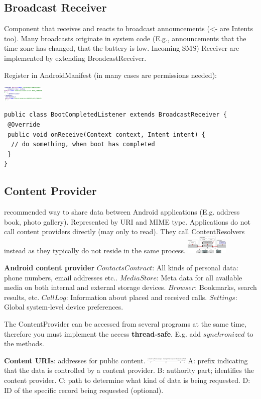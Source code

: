\subsection{Broadcast Receiver}
Component that receives and reacts to broadcast announcements (<- are Intents too).
Many broadcasts originate in system code (E.g., announcements that the time
zone has changed, that the battery is low. Incoming SMS)
Receiver are implemented by extending BroadcastReceiver.

Register in AndroidManifest (in many cases are permissions needed):

\includegraphics[width=0.15\textwidth]{android/broadcast_receiver.png}

\begin{lstlisting}
public class BootCompletedListener extends BroadcastReceiver {
 @Override
 public void onReceive(Context context, Intent intent) {
  // do something, when boot has completed
 }
}
\end{lstlisting}

\subsection{Content Provider}
recommended way to share data between Android applications (E.g. address book,
photo gallery). Represented by URI and MIME type.
Applications do not call content providers directly (may only to read). They
call ContentResolvers instead as they typically do not reside in the same
process.
\includegraphics[width=0.15\textwidth]{android/content_provider.png}

\textbf{Android content provider} $ContactsContract$: All kinds of personal
data: phone numbers, email addresses etc.. $MediaStore$: Meta data for all
available media on both internal and external storage devices. $Browser$:
Bookmarks, search results, etc. $CallLog$: Information about placed and
received calls. $Settings$: Global system-level device preferences.

The ContentProvider can be accessed from several programs at the same time,
therefore you must implement the access \textbf{thread-safe}. E.g. add
$synchronized$ to the methods.

\textbf{Content URIs}: addresses for public content.
\includegraphics[width=0.15\textwidth]{android/content_uri.png}
A: prefix indicating that the data is controlled by a content provider. B:
authority part; identifies the content provider. C: path to determine what kind
of data is being requested. D: ID of the specific record being requested
(optional).

